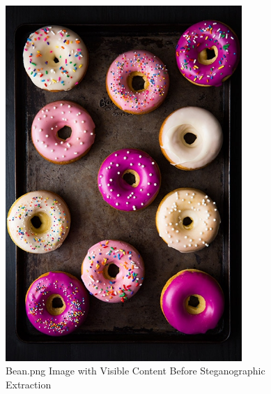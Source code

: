 \begin{figure}[h]
    \centering
    \includegraphics[width=0.8\textwidth]{images/Artifact and Evidence Recovery/bean_recipe.png}
    \caption{Bean.png Image with Visible Content Before Steganographic Extraction}
    \label{fig:bean_image}
\end{figure}

